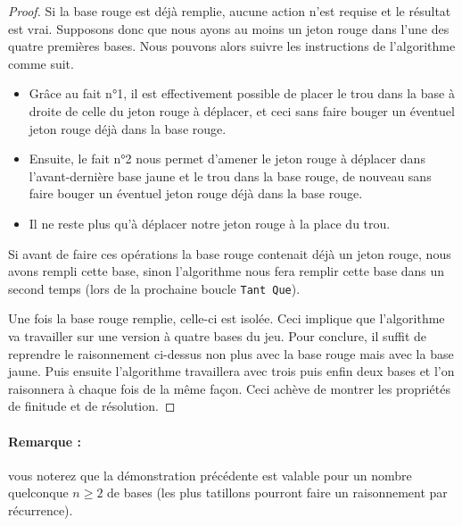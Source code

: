 \begin{proof}
    \medskip

    Si la base rouge est déjà remplie, aucune action n'est requise et le résultat est vrai.
    Supposons donc que nous ayons au moins un jeton rouge dans l'une des quatre premières bases. Nous pouvons alors suivre les instructions de l'algorithme comme suit.


    \medskip

    \begin{itemize}
        \item[\textbullet] Grâce au fait n°1, il est effectivement possible de placer le trou dans la base à droite de celle du jeton rouge à déplacer, et ceci sans faire bouger un éventuel jeton rouge déjà dans la base rouge.

        \medskip

        \item[\textbullet] Ensuite, le fait n°2 nous permet d'amener le jeton rouge à déplacer dans l'avant-dernière base jaune et le trou dans la base rouge, de nouveau sans faire bouger un éventuel jeton rouge déjà dans la base rouge.

        \medskip

        \item[\textbullet] Il ne reste plus qu'à déplacer notre jeton rouge à la place du trou.
    \end{itemize}


    \medskip

    Si avant de faire ces opérations la base rouge contenait déjà un jeton rouge, nous avons rempli cette base, sinon l'algorithme nous fera remplir cette base dans un second temps (lors de la prochaine boucle \verb+Tant Que+).


    \medskip

    Une fois la base rouge remplie, celle-ci est isolée. Ceci implique que l'algorithme va travailler sur une version à quatre bases du jeu. Pour conclure, il suffit de reprendre le raisonnement ci-dessus non plus avec la base rouge mais avec la base jaune. Puis ensuite l'algorithme travaillera avec trois puis enfin deux bases et l'on raisonnera à chaque fois de la même façon. Ceci achève de montrer les propriétés de finitude et de résolution.

\end{proof}


\paragraph{Remarque :} \hspace{-1em} vous noterez que la démonstration précédente est valable pour un nombre quelconque $n \geqslant 2$ de bases (les plus tatillons pourront faire un raisonnement par récurrence).
